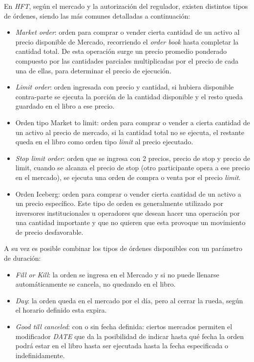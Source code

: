 En \emph{HFT}, según el mercado y la autorización del regulador, existen
distintos tipos de órdenes, siendo las más comunes detalladas a continuación:
\begin{itemize}
 \item \emph{Market order}: orden para comprar o vender cierta cantidad de un
 activo al precio disponible de Mercado, recorriendo el \emph{order book} hasta
 completar la cantidad total. De esta operación surge un precio promedio
 ponderado compuesto por las cantidades parciales multiplicadas por el precio
 de cada una de ellas, para determinar el precio de ejecución.
 \item \emph{Limit order}: orden ingresada con precio y cantidad, si hubiera
 disponible contra-parte se ejecuta la porción de la cantidad disponible y el
 resto queda guardado en el libro a ese precio. 
 \item Orden tipo Market to limit: orden para comprar o vender a cierta
 cantidad de un activo al precio de mercado, si la cantidad total no se
 ejecuta, el restante queda en el libro como orden tipo \emph{limit} al precio
 ejecutado.
 \item \emph{Stop limit order}: orden que se ingresa con 2 precios, precio de
 stop y precio de limit, cuando se alcanza el precio de stop (otro participante
 opera a ese precio en el mercado), se ejecuta una orden de compra o venta por
 el precio \emph{limit}.
 \item Orden Iceberg: orden para comprar o vender cierta cantidad de un activo
 a un precio específico. Este tipo de orden es generalmente utilizado por
 inversores institucionales u operadores que desean hacer una operación por una
 cantidad importante y que no quieren que esta provoque un movimiento de precio
 desfavorable.
\end{itemize}

A su vez es posible combinar los tipos de órdenes disponibles con un parámetro
de duración:
\begin{itemize}
 \item \emph{Fill or Kill}: la orden se ingresa en el Mercado y si no puede llenarse
 automáticamente se cancela, no quedando en el libro.
 \item \emph{Day}: la orden queda en el mercado por el día, pero al cerrar la rueda,
 según el horario definido esta expira.
 \item \emph{Good till canceled}: con o sin fecha definida: ciertos mercados permiten
 el modificador \emph{DATE} que da la posibilidad de indicar hasta qué fecha la orden
 podrá estar en el libro hasta ser ejecutada hasta la fecha especificada o
 indefinidamente. 
\end{itemize}

